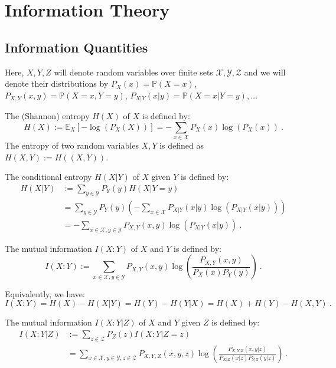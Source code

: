 \section{Information Theory}
\subsection{Information Quantities}
Here, $X,Y,Z$ will denote random variables over finite sets $\mathcal{X},\mathcal{Y},\mathcal{Z}$ and we will denote their distributions by $P_X(x) = \mathbb{P}(X=x)$, $P_{X,Y}(x,y) = \mathbb{P}(X=x,Y=y)$, $P_{X|Y}(x|y) = \mathbb{P}(X=x|Y=y), \ldots$
\begin{definition}
   The (Shannon) entropy $H(X)$ of $X$ is defined by:
   \[ H(X) := \mathbb{E}_X[-\log(P_X(X))] = -\sum_{x \in \mathcal{X}}P_X(x)\log(P_X(x))\ . \]
   The entropy of two random variables $X,Y$ is defined as $H(X,Y) := H((X,Y))$.
\end{definition}

\begin{definition}
  The conditional entropy $H(X|Y)$ of $X$ given $Y$ is defined by:
   \begin{equation}
      \begin{aligned}
        H(X|Y) &:=  \sum_{y \in \mathcal{Y}}P_Y(y)H(X|Y=y)\\
        &=  \sum_{y \in \mathcal{Y}}P_Y(y)\left(-\sum_{x \in \mathcal{X}}P_{X|Y}(x|y)\log(P_{X|Y}(x|y)) \right)\\
        &= -\sum_{x \in \mathcal{X}, y \in \mathcal{Y}}P_{X,Y}(x,y)\log(P_{X|Y}(x|y)) \ .
        \end{aligned}
     \end{equation}
\end{definition}

\begin{definition}
  The mutual information $I(X:Y)$ of $X$ and $Y$ is defined by:
    \[ I(X:Y) := \sum_{x \in \mathcal{X}, y \in \mathcal{Y}}P_{X,Y}(x,y)\log\left(\frac{P_{X,Y}(x,y)}{P_X(x)P_Y(y)}\right)\ .\]
\end{definition}

\begin{proposition}
Equivalently, we have:
\[ I(X:Y) = H(X) - H(X|Y) = H(Y) - H(Y|X) = H(X) + H(Y) - H(X,Y) \ .\]
\end{proposition}

\begin{definition}
  The mutual information $I(X:Y|Z)$ of $X$ and $Y$ given $Z$ is defined by:
    \begin{equation}
       \begin{aligned}
          I(X:Y|Z) &:= \sum_{z \in \mathcal{Z}}P_Z(z)I(X : Y|Z=z)\\
          &= \sum_{x \in \mathcal{X}, y \in \mathcal{Y}, z \in \mathcal{Z}}P_{X,Y,Z}(x,y,z)\log\left(\frac{P_{X,Y|Z}(x,y|z)}{P_{X|Z}(x|z)P_{Y|Z}(y|z)}\right)\ .
       \end{aligned}
     \end{equation}   
\end{definition}

